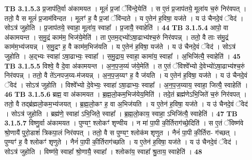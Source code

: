 \documentclass[17pt]{extarticle}
\begin{document}
{{                  \newline
                                \textbf{ TB 3.1.5.3} \newline
                  प्र॒जाप॑ति॒र्वा अ॑कामयत । मूलं॑ प्र॒जां ॅवि॑न्दे॒येति॑ । स ए॒तं प्र॒जाप॑तये॒ मूला॑य च॒रुं निर॑वपत् । ततो॒ वै स मूलं॑ प्र॒जाम॑विन्दत । मूलꣳ॑ ह॒ वै प्र॒जां ॅवि॑न्दते । य ए॒तेन॑ ह॒विषा॒ यज॑ते । य उ॑ चैनदे॒वं ॅवेद॑ । सोऽत्र॑ जुहोति । प्र॒जाप॑तये॒ स्वाहा॒ मूला॑य॒ स्वाहा᳚ । प्र॒जायै॒ स्वाहेति॑ । \textbf{ 44} \newline
                  \newline
                                \textbf{ TB 3.1.5.4} \newline
                  आपो॒ वा अ॑कामयन्त । स॒मु॒द्रं काम॑म॒ भिज॑ये॒मेति॑ । ता ए॒तम॒द्भ्यो॑ऽषा॒ढाभ्य॑श्च॒रुं निर॑वपन्न् । ततो॒ वै ताः स॑मु॒द्रं काम॑म॒भ्य॑जयन्न् । स॒मु॒द्रꣳ ह॒ वै काम॑म॒भिज॑यति । य ए॒तेन॑ ह॒विषा॒ यज॑ते । य उ॑ चैनदे॒वं ॅवेद॑ । सोऽत्र॑ जुहोति । अ॒द्भ्यः स्वाहा॑ ऽषा॒ढाभ्यः॒ स्वाहा᳚ । स॒मु॒द्राय॒ स्वाहा॒ कामा॑य॒ स्वाहा᳚ । अ॒भिजि॑त्यै॒ स्वाहेति॑ । \textbf{ 45} \newline
                  \newline
                                \textbf{ TB 3.1.5.5} \newline
                  विश्वे॒ वै दे॒वा अ॑कामयन्त । अ॒न॒प॒ज॒य्यं ज॑ये॒मेति॑ । त ए॒तं ॅविश्वे᳚भ्यो दे॒वेभ्यो॑ऽषा॒ढाभ्य॑श्च॒रुं निर॑वपन्न् । ततो॒ वै ते॑ऽनपज॒य्य-म॑जयन्न् । अ॒न॒प॒ज॒य्यꣳ ह॒ वै ज॑यति । य ए॒तेन॑ ह॒विषा॒ यज॑ते । य उ॑ चैनदे॒वं ॅवेद॑ । सोऽत्र॑ जुहोति । विश्वे᳚भ्यो दे॒वेभ्यः॒ स्वाहा॑ ऽषा॒ढाभ्यः॒ स्वाहा᳚ । अ॒न॒प॒ज॒य्याय॒ स्वाहा॒ जित्यै॒ स्वाहेति॑ । \textbf{ 46} \newline
                  \newline
                                \textbf{ TB 3.1.5.6} \newline
                  ब्रह्म॒ वा अ॑कामयत । ब्र॒ह्म॒लो॒कम॒भिज॑येय॒मिति॑ । तदे॒तं ब्रह्म॑णेऽभि॒जिते॑ च॒रुं निर॑वपत् । ततो॒ वै तद्ब्र॑ह्मलो॒कम॒भ्य॑जयत् । ब्र॒ह्म॒लो॒कꣳ ह॒ वा अ॒भिज॑यति । य ए॒तेन॑ ह॒विषा॒ यज॑ते । य उ॑ चैनदे॒वं ॅवेद॑ । सोऽत्र॑ जुहोति । ब्रह्म॑णे॒ स्वाहा॑ ऽभि॒जिते॒ स्वाहा᳚ । ब्र॒ह्म॒लो॒काय॒ स्वाहा॒ ऽभिजि॑त्यै॒ स्वाहेति॑ । \textbf{ 47} \newline
                  \newline
                                \textbf{ TB 3.1.5.7} \newline
                  विष्णु॒र्वा अ॑कामयत । पुण्यꣳ॒॒ श्लोकꣳ॑ शृण्वीय । न मा॑ पा॒पी की॒र्तिराग॑च्छे॒दिति॑ । स ए॒तं ॅविष्ण॑वे श्रो॒णायै॑ पुरो॒डाशं॑ त्रिकपा॒लं निर॑वपत् । ततो॒ वै स पुण्यꣳ॒॒ श्लोक॑म शृणुत । नैनं॑ पा॒पी की॒र्तिरा- ग॑च्छत् । पुण्यꣳ॑ ह॒ वै श्लोकꣳ॑ शृणुते । नैनं॑ पा॒पी की॒र्तिराग॑च्छति । य ए॒तेन॑ ह॒विषा॒ यज॑ते । य उ॑ चैनदे॒वं ॅवेद॑ । सोऽत्र॑ जुहोति । विष्ण॑वे॒ स्वाहा᳚ श्रो॒णायै॒ स्वाहा᳚ । श्लोका॑य॒ स्वाहा᳚ श्रु॒ताय॒ स्वाहेति॑ । \textbf{ 48} \newline
}}
\end{document}
